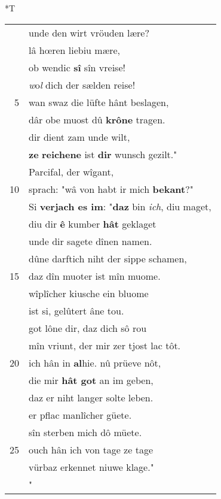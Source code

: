 \documentclass[8pt,a4paper,notitlepage]{article}
\begin{document}
\begin{table}[ht]
\begin{minipage}[t]{0.5\linewidth}
\end{minipage}
\hspace{0.5cm}
\begin{minipage}[t]{0.5\linewidth}
\small
\begin{center}*T
\end{center}
\begin{tabular}{rl}
 & unde den wirt vröuden lære?\\ 
 & lâ hœren liebiu mære,\\ 
 & ob wendic \textbf{sî} sîn vreise!\\ 
 & \textit{w}o\textit{l} dich der sælden reise!\\ 
5 & wan swaz die lüfte hânt beslagen,\\ 
 & dâr obe muost dû \textbf{krône} tragen.\\ 
 & dir dient zam unde wilt,\\ 
 & \textbf{ze} \textbf{reichene} ist \textbf{dir} wunsch gezilt."\\ 
 & Parcifal, der wîgant,\\ 
10 & sprach: "wâ von habt ir mich \textbf{bekant}?"\\ 
 & Si \textbf{verjach es im}: "\textbf{daz} bin \textit{ich}, diu maget,\\ 
 & diu dir \textbf{ê} kumber \textbf{hât} geklaget\\ 
 & unde dir sagete dînen namen.\\ 
 & dûne darftich niht der sippe schamen,\\ 
15 & daz dîn muoter ist mîn muome.\\ 
 & wîplîcher kiusche ein bluome\\ 
 & ist si, gelûtert âne tou.\\ 
 & got lône dir, daz dich sô rou\\ 
 & mîn vriunt, der mir zer tjost lac tôt.\\ 
20 & ich hân in \textbf{al}hie. nû prüeve nôt,\\ 
 & die mir \textbf{hât got} an im geben,\\ 
 & daz er niht langer solte leben.\\ 
 & er pflac manlîcher güete.\\ 
 & sîn sterben mich dô müete.\\ 
25 & ouch hân ich von tage ze tage\\ 
 & vürbaz erkennet niuwe klage."\\ 
 & "\textit{\begin{large}O\end{large}}uwê, war kom dîn rôter munt?\\ 

\end{tabular}
\end{minipage}
\end{table}
\end{document}
